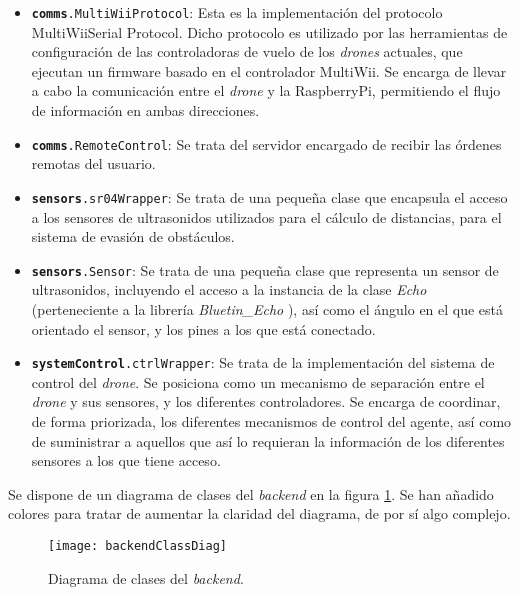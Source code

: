 \begin{itemize}
\item \texttt{\textbf{comms}.MultiWiiProtocol}: Esta es la implementación del protocolo MultiWiiSerial Protocol. Dicho protocolo es utilizado por las herramientas de configuración de las controladoras de vuelo de los \emph{drones} actuales, que ejecutan un firmware basado en el controlador MultiWii. Se encarga de llevar a cabo la comunicación entre el \emph{drone} y la RaspberryPi, permitiendo el flujo de información en ambas direcciones. 
\item \texttt{\textbf{comms}.RemoteControl}: Se trata del servidor encargado de recibir las órdenes remotas del usuario.
\item \texttt{\textbf{sensors}.sr04Wrapper}: Se trata de una pequeña clase que encapsula el acceso a los sensores de ultrasonidos utilizados para el cálculo de distancias, para el sistema de evasión de obstáculos.
\item \texttt{\textbf{sensors}.Sensor}: Se trata de una pequeña clase que representa un sensor de ultrasonidos, incluyendo el acceso a la instancia de la clase \emph{Echo} (perteneciente a la librería \emph{Bluetin\_Echo} ), así como el ángulo en el que está orientado el sensor, y los pines a los que está conectado.
\item \texttt{\textbf{systemControl}.ctrlWrapper}: Se trata de la implementación del sistema de control del \emph{drone}. Se posiciona como un mecanismo de separación entre el \emph{drone} y sus sensores, y los diferentes controladores. Se encarga de coordinar, de forma priorizada, los diferentes mecanismos de control del agente, así como de suministrar a aquellos que así lo requieran la información de los diferentes sensores a los que tiene acceso.
\end{itemize}

Se dispone de un diagrama de clases del \emph{backend} en la figura \ref{fig:backendClassDiag}. Se han añadido colores para tratar de aumentar la claridad del diagrama, de por sí algo complejo.
\newpage

\begin{figure}
	\centering
	\texttt{[image: backendClassDiag]}
	\caption[Diagrama de clases BackEnd]{Diagrama de clases del \emph{backend}.}\label{fig:backendClassDiag}
\end{figure}


